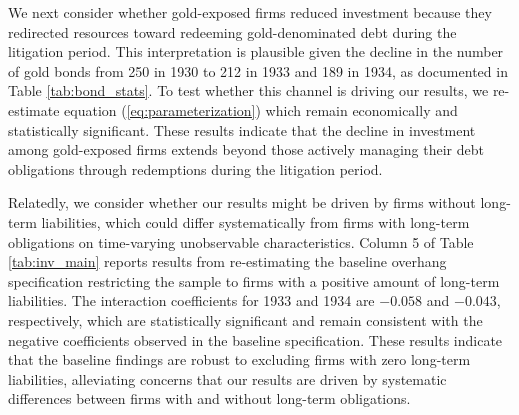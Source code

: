 We next consider whether gold-exposed firms reduced investment because they redirected resources toward redeeming gold-denominated debt during the litigation period. This interpretation is plausible given the decline in the number of gold bonds from 250 in 1930 to 212 in 1933 and 189 in 1934, as documented in Table \ref{tab:bond_stats}. To test whether this channel is driving our results, we re-estimate equation (\ref{eq:parameterization})  which remain economically and statistically significant. These results indicate that the decline in investment among gold-exposed firms extends beyond those actively managing their debt obligations through redemptions during the litigation period. 

Relatedly, we consider whether our results might be driven by firms without long-term liabilities, which could differ systematically from firms with long-term obligations on time-varying unobservable characteristics. Column 5 of Table \ref{tab:inv_main} reports results from re-estimating the baseline overhang specification restricting the sample to firms with a positive amount of long-term liabilities. The interaction coefficients for 1933 and 1934 are $-0.058$ and $-0.043$, respectively, which are statistically significant and remain consistent with the negative coefficients observed in the baseline specification. These results indicate that the baseline findings are robust to excluding firms with zero long-term liabilities, alleviating concerns that our results are driven by systematic differences between firms with and without long-term obligations. 

